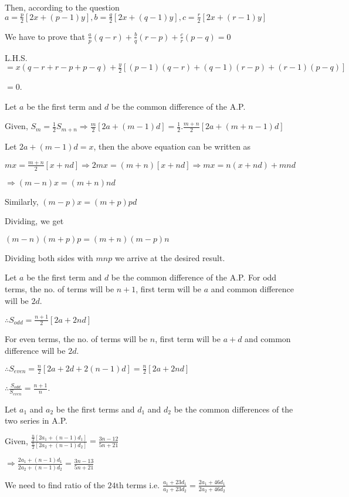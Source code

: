   Then, according to the question $a = \frac{p}{2}[2x + (p - 1)y], b = \frac{q}{2}[2x + (q - 1)y], c = \frac{r}{2}[2x + (r - 1)y]$

  We have to prove that $\frac{a}{p}(q - r) + \frac{b}{q}(r - p) + \frac{c}{r}(p - q) = 0$

  L.H.S. $= x(q - r + r - p + p - q) + \frac{y}{2}[(p - 1)(q - r) + (q - 1)(r - p) + (r - 1)(p - q)]$

  $= 0$.
\item Let $a$ be the first term and $d$ be the common difference of the A.P.

  Given, $S_m = \frac{1}{2}S_{m + n}\Rightarrow \frac{m}{2}[2a + (m - 1)d] = \frac{1}{2}.\frac{m + n}{2}[2a + (m + n - 1)d]$

  Let $2a + (m - 1)d = x$, then the above equation can be written as

  $mx = \frac{m + n}{2}[x + nd] \Rightarrow 2mx = (m + n)[x + nd]\Rightarrow mx = n(x + nd) + mnd$

  $\Rightarrow (m - n)x = (m + n)nd$

  Similarly, $(m - p)x = (m + p)pd$

  Dividing, we get

  $(m - n)(m + p)p = (m + n)(m - p)n$

  Dividing both sides with $mnp$ we arrive at the desired result.
\item Let $a$ be the first term and $d$ be the common difference of the A.P. For odd terms, the no. of terms will be $n + 1$, first
  term will be $a$ and common difference will be $2d$.

  $\therefore S_{odd} = \frac{n + 1}{2}[2a + 2nd]$

  For even terms, the no. of terms will be $n$, first term will be $a + d$ and common difference will be $2d$.

  $\therefore S_{even} = \frac{n}{2}[2a + 2d + 2(n - 1)d] = \frac{n}{2}[2a + 2nd]$

  $\therefore \frac{S_{odd}}{S_{even}} = \frac{n + 1}{n}$.
\item Let $a_1$ and $a_2$ be the first terms and $d_1$ and $d_2$ be the common differences of the two series in A.P.

  Given, $\frac{\tfrac{n}{2}[2a_1 + (n - 1)d_1]}{\tfrac{n}{2}[2a_2 + (n - 1)d_2]} = \frac{3n - 12}{5n + 21}$

  $\Rightarrow \frac{2a_1 + (n - 1)d_1}{2a_2 + (n - 1)d_2} = \frac{3n - 13}{5n + 21}$

  We need to find ratio of the $24$th terms i.e. $\frac{a_1 + 23d_1}{a_2 + 23d_2} = \frac{2a_1 + 46d_1}{2a_2 + 46d_2}$


